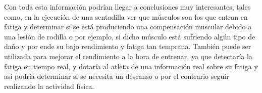 Con toda esta información podrían llegar a conclusiones muy interesantes, tales como, en la ejecución de una sentadilla ver que músculos son los que entran en fatiga y determinar si se está produciendo una compensación muscular debido a una lesión de rodilla o por ejemplo, si dicho músculo está sufriendo algún tipo de daño y por ende su bajo rendimiento y fatiga tan temprana.
También puede ser utilizada para mejorar el rendimiento a la hora de entrenar, ya que detectaría la fatiga en tiempo real, y dotaría al atleta de una información real sobre su fatiga y así podría determinar si se necesita un descanso o por el contrario seguir realizando la actividad física.
